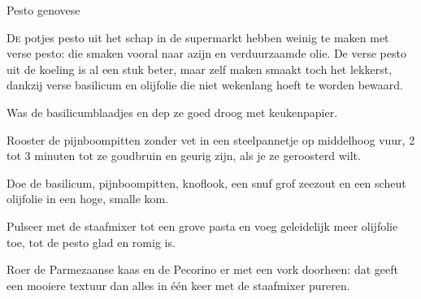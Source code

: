 \begin{recipe}{Pesto genovese}
\label{recipe:pesto-genovese}


\lettrine{D}{e} potjes pesto uit het schap in de supermarkt hebben weinig te
maken met verse pesto: die smaken vooral naar azijn en verduurzaamde olie. De
verse pesto uit de koeling is al een stuk beter, maar zelf maken smaakt toch
het lekkerst, dankzij verse basilicum en olijfolie die niet wekenlang hoeft
te worden bewaard.

\begin{ingredients}
\end{ingredients}

\begin{steps}
  \item Was de basilicumblaadjes en dep ze goed droog met keukenpapier.
  \item Rooster de pijnboompitten zonder vet in een steelpannetje op
        middelhoog vuur, 2 tot 3 minuten tot ze goudbruin en geurig zijn, als
        je ze geroosterd wilt.
  \item Doe de basilicum, pijnboompitten, knoflook, een snuf grof zeezout en
        een scheut olijfolie in een hoge, smalle kom.
  \item Pulseer met de staafmixer tot een grove pasta en voeg geleidelijk
        meer olijfolie toe, tot de pesto glad en romig is.
  \item Roer de Parmezaanse kaas en de Pecorino er met een vork doorheen: dat
        geeft een mooiere textuur dan alles in één keer met de staafmixer
        pureren.
\end{steps}
\end{recipe}

